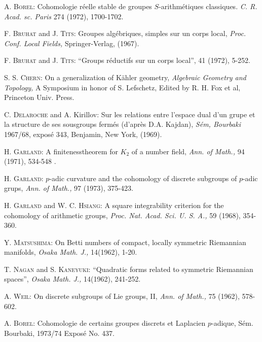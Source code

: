 \begin{thebibliography}{99}
 \textsc{A. Borel:} Cohomologie r\'eelle stable de groupes $S$-arithm\'etiques classiques. \textit{C. R. Acad. sc. Paris} 274 (1972), 1700-1702.

 \textsc{F. Bruhat} and \textsc{J. Tits}: Groupes alg\'ebriques, simples sur un corps local, \textit{Proc. Conf. Local Fields,} Springer-Verlag, (1967).

 \textsc{F. Bruhat} and \textsc{J. Tits:} ``Groups r\'eductifs sur un corps local'',  41 (1972), 5-252.

 \textsc{S. S. Chern}: On a generalization of K\"ahler geometry, \textit{Algebraic Geometry and Topology,} A Symposium in honor of S. Lefschetz, Edited by R. H. Fox et al, Princeton Univ. Press.

 \textsc{C. Delaroche} and A. Kirillov: Sur les relations entre l'espace dual d'un grupe et la structure de ses sousgroups ferm\'es (d'apr\`es D.A. Kajdan), \textit{S\'em, Bourbaki} 1967/68, expos\'e 343, Benjamin, New York, (1969).

 \textsc{H. Garland}: A finiteness\pageoriginale theorem for $K_2$ of a number field, \textit{Ann. of Math.,} 94 (1971), 534-548 .

 \textsc{H. Garland}: $p$-adic curvature and the cohomology of discrete subgroups of $p$-adic grups, \textit{Ann. of Math.,} 97 (1973), 375-423.

 \textsc{H. Garland} and \textsc{W. C. Hsiang}: A square integrability criterion for the cohomology of arithmetic groups, \textit{Proc. Nat. Acad. Sci. U. S. A.,} 59 (1968), 354-360.

 \textsc{Y. Matsushima}: On Betti numbers of compact, locally symmetric Riemannian manifolds, \textit{Osaka Math. J.,} 14(1962), 1-20.

 \textsc{T. Nagan} and \textsc{S. Kaneyuki}: ``Quadratic forms related to symmetric Riemannian spaces'', \textit{Osaka Math. J.,} 14(1962), 241-252.

 \textsc{A. Weil:} On discrete subgroups of Lie groups, II, \textit{Ann. of Math.,} 75 (1962), 578-602.

 \textsc{A. Borel:} Cohomologie de certains groupes discrets et Laplacien $p$-adique, S\'em. Bourbaki, 1973/74 Expos\'e No. 437.
\end{thebibliography}





